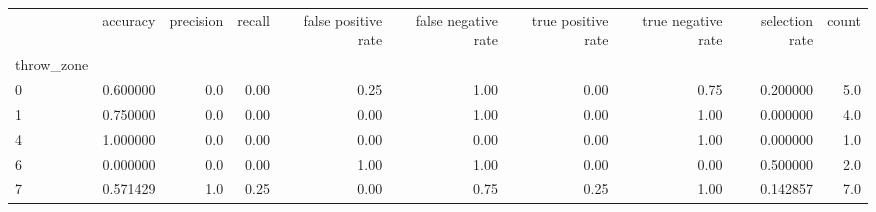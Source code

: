\begin{tabular}{lrrrrrrrrr}
\toprule
{} &  accuracy &  precision &  recall &  false positive rate &  false negative rate &  true positive rate &  true negative rate &  selection rate &  count \\
throw\_zone &           &            &         &                      &                      &                     &                     &                 &        \\
\midrule
0          &  0.600000 &        0.0 &    0.00 &                 0.25 &                 1.00 &                0.00 &                0.75 &        0.200000 &    5.0 \\
1          &  0.750000 &        0.0 &    0.00 &                 0.00 &                 1.00 &                0.00 &                1.00 &        0.000000 &    4.0 \\
4          &  1.000000 &        0.0 &    0.00 &                 0.00 &                 0.00 &                0.00 &                1.00 &        0.000000 &    1.0 \\
6          &  0.000000 &        0.0 &    0.00 &                 1.00 &                 1.00 &                0.00 &                0.00 &        0.500000 &    2.0 \\
7          &  0.571429 &        1.0 &    0.25 &                 0.00 &                 0.75 &                0.25 &                1.00 &        0.142857 &    7.0 \\
\bottomrule
\end{tabular}
